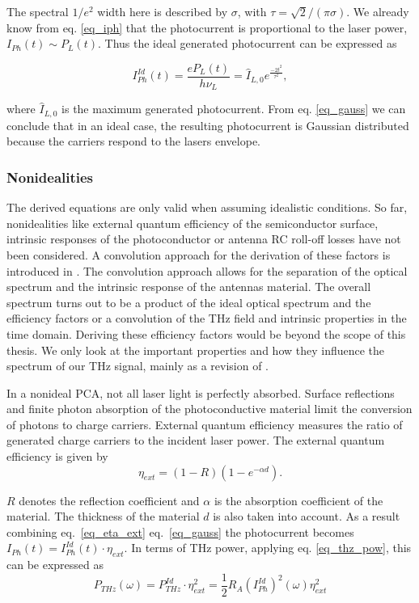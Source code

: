 The spectral $1/e^2$ width here is described by $\sigma$, with $\tau = \sqrt{2}/(\pi \sigma)$. We already know from eq. \eqref{eq_iph} that the photocurrent is proportional to the laser power, $I_{Ph}(t) \sim P_L(t)$. Thus the ideal generated photocurrent can be expressed as 

\begin{equation}
	I_{Ph}^{Id}(t) = \frac{eP_L(t)}{h\nu_L} = \hat{I}_{L,0} e^{\frac{-2t^2}{\tau^2}},
\label{eq_gauss}
\end{equation}

where $\hat{I}_{L,0}$ is the maximum generated photocurrent. From eq. \eqref{eq_gauss} we can conclude that in an ideal case, the resulting photocurrent is Gaussian distributed because the carriers respond to the lasers envelope. 

\subsubsection{Nonidealities}

The derived equations are only valid when assuming idealistic conditions. So far, nonidealities like external quantum efficiency of the semiconductor surface, intrinsic responses of the photoconductor or antenna RC roll-off losses have not been considered. A convolution approach for the derivation of these factors is introduced in \cite{preuUnifiedDerivationTerahertz2014}. The convolution approach allows for the separation of the optical spectrum and the intrinsic response of the antennas material. The overall spectrum turns out to be a product of the ideal optical spectrum and the efficiency factors or a convolution of the THz field and intrinsic properties in the time domain. Deriving these efficiency factors would be beyond the scope of this thesis. We only look at the important properties and how they influence the spectrum of our THz signal, mainly as a revision of \cite{faridiPulsedFreeSpace2023}.

In a nonideal PCA, not all laser light is perfectly absorbed. Surface reflections and finite photon absorption of the photoconductive material limit the conversion of photons to charge carriers. External quantum efficiency measures the ratio of generated charge carriers to the incident laser power. The external quantum efficiency is given by 
\begin{equation}
	\eta_{ext} = (1-R)(1-e^{-\alpha d}). 
	\label{eq_eta_ext}
\end{equation}

$R$ denotes the reflection coefficient and $\alpha$ is the absorption coefficient of the material. The thickness of the material $d$ is also taken into account. As a result combining eq.~\eqref{eq_eta_ext} eq.~\eqref {eq_gauss} the photocurrent becomes $I_{Ph}(t) = I_{Ph}^{Id}(t) \cdot \eta_{ext}$. In terms of THz power, applying eq. \eqref{eq_thz_pow}, this can be expressed as  
\begin{equation}
	P_{THz}(\omega) = P_{THz}^{Id} \cdot \eta_{ext}^2 = \frac{1}{2}R_A (I_{Ph}^{Id})^2(\omega)\eta_{ext}^2
\end{equation}

